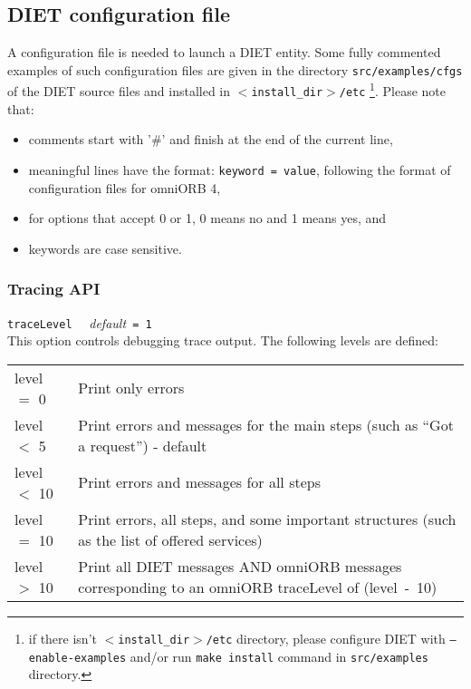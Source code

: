 \subsection{DIET configuration file}
\label{sec:diet_config_files}

A configuration file is needed to launch a DIET entity. Some fully
commented examples of such configuration files are given in the
directory \texttt{src/examples/cfgs} of the DIET source files and
installed in \texttt{$<$install\_dir$>$/etc} \footnote{if there isn't
\texttt{$<$install\_dir$>$/etc} directory, please configure DIET with
\texttt{--enable-examples} and/or run \texttt{make install} command in
\texttt{src/examples} directory.}. Please note that:
\begin{itemize}
\item comments start with '\#' and finish at the end of the current
  line,
\item meaningful lines have the format: \texttt{keyword = value},
  following the format of configuration files for omniORB 4,
\item for options that accept 0 or 1, 0 means no and 1 means yes, and
\item keywords are case sensitive.
\end{itemize}

\subsubsection{Tracing API}

\noindent
\texttt{traceLevel} \ \ \emph{default}\texttt{ = 1}\\
This option controls debugging trace output. The following levels are defined:

\begin{center}
 \footnotesize
 \begin{tabular}{p{.1\linewidth}p{.8\linewidth}}
  level $=$ 0  & Print only errors\\
  level $<$ 5  & Print errors and messages for the main steps (such as ``Got a
  request'') - default\\
  level $<$ 10 & Print errors and messages for all steps\\
  level $=$ 10 & Print errors, all steps, and some important structures (such
  as the list of offered services)\\
  level $>$ 10 & Print all DIET messages AND omniORB messages corresponding to
  an omniORB traceLevel of (level~-~10)
 \end{tabular}
\end{center}


